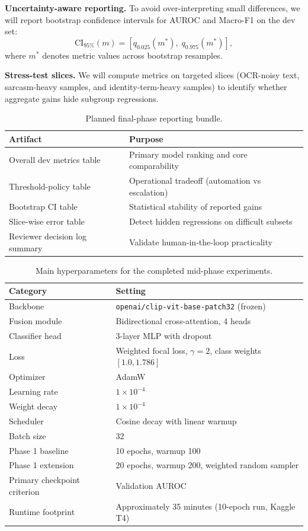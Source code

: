 \documentclass[11pt]{article}
\begin{document}
\textbf{Uncertainty-aware reporting.}
To avoid over-interpreting small differences, we will report bootstrap confidence intervals for AUROC and Macro-F1 on the dev set:
\[
\text{CI}_{95\%}(m) = [q_{0.025}(m^*),\; q_{0.975}(m^*)],
\]
where \(m^*\) denotes metric values across bootstrap resamples.

\textbf{Stress-test slices.}
We will compute metrics on targeted slices (OCR-noisy text, sarcasm-heavy samples, and identity-term-heavy samples) to identify whether aggregate gains hide subgroup regressions.

\begin{table}[h]
\centering
\small
\caption{Planned final-phase reporting bundle.}
\begin{tabularx}{\columnwidth}{lX}
\toprule
Artifact & Purpose \\
\midrule
Overall dev metrics table & Primary model ranking and core comparability \\
Threshold-policy table & Operational tradeoff (automation vs escalation) \\
Bootstrap CI table & Statistical stability of reported gains \\
Slice-wise error table & Detect hidden regressions on difficult subsets \\
Reviewer decision log summary & Validate human-in-the-loop practicality \\
\bottomrule
\end{tabularx}
\label{tab:reportbundle}
\end{table}

\begin{table}[t]
\centering
\small
\caption{Main hyperparameters for the completed mid-phase experiments.}
\begin{tabular}{ll}
\toprule
Category & Setting \\
\midrule
Backbone & \texttt{openai/clip-vit-base-patch32} (frozen) \\
Fusion module & Bidirectional cross-attention, 4 heads \\
Classifier head & 3-layer MLP with dropout \\
Loss & Weighted focal loss, \(\gamma=2\), class weights \([1.0,1.786]\) \\
Optimizer & AdamW \\
Learning rate & \(1\times 10^{-4}\) \\
Weight decay & \(1\times 10^{-4}\) \\
Scheduler & Cosine decay with linear warmup \\
Batch size & 32 \\
Phase 1 baseline & 10 epochs, warmup 100 \\
Phase 1 extension & 20 epochs, warmup 200, weighted random sampler \\
Primary checkpoint criterion & Validation AUROC \\
Runtime footprint & Approximately 35 minutes (10-epoch run, Kaggle T4) \\
\bottomrule
\end{tabular}
\label{tab:hyperparams}
\end{table}
\end{document}
